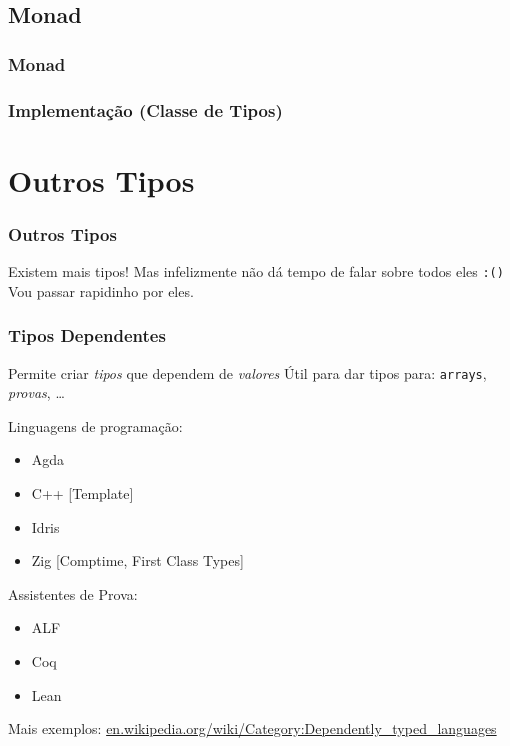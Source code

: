 \documentclass{beamer}
\begin{document}
\subsection{Monad}
\begin{frame}
    \frametitle{Monad}
\end{frame}

\begin{frame}
    \frametitle{Implementação (Classe de Tipos)}
\end{frame}

\section{Outros Tipos}
\begin{frame}
    \frametitle{Outros Tipos}
    Existem mais tipos!
    \vfill
    Mas infelizmente não dá tempo de falar sobre todos eles
    \texttt{:(\phantom)}
    \vfill
    Vou passar rapidinho por eles.
\end{frame}

\begin{frame}
    \frametitle{Tipos Dependentes}
    Permite criar \emph{tipos} que dependem de \emph{valores}
    \vfill
    Útil para dar tipos para: \texttt{arrays}, \emph{provas}, \dots
    \vfill
    \begin{multicols}{2}
        Linguagens de programação:
        \begin{itemize}
            \item Agda
            \item C++ [Template]
            \item Idris
            \item Zig [Comptime, First Class Types]
        \end{itemize}
        \columnbreak
        Assistentes de Prova:
        \begin{itemize}
            \item ALF
            \item Coq
            \item Lean
        \end{itemize}
    \end{multicols}
    \vfill
    Mais exemplos:
    \url{en.wikipedia.org/wiki/Category:Dependently_typed_languages}
\end{frame}
\end{document}
